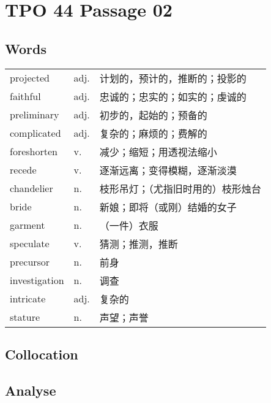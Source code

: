 \section{TPO 44 Passage 02}

\subsection{Words}

\begin{tabular}{lll}
    projected     & adj. & 计划的，预计的，推断的；投影的   \\
    faithful      & adj. & 忠诚的；忠实的；如实的；虔诚的   \\
    preliminary   & adj. & 初步的，起始的；预备的       \\
    complicated   & adj. & 复杂的；麻烦的；费解的       \\
    foreshorten   & v.   & 减少；缩短；用透视法缩小      \\
    recede        & v.   & 逐渐远离；变得模糊，逐渐淡漠    \\
    chandelier    & n.   & 枝形吊灯；（尤指旧时用的）枝形烛台 \\
    bride         & n.   & 新娘；即将（或刚）结婚的女子    \\
    garment       & n.   & （一件）衣服            \\
    speculate     & v.   & 猜测；推测，推断          \\
    precursor     & n.   & 前身                \\
    investigation & n.   & 调查                \\
    intricate     & adj. & 复杂的               \\
    stature       & n.   & 声望；声誉             \\
\end{tabular}

\subsection{Collocation}

\newpage

\subsection{Analyse}


